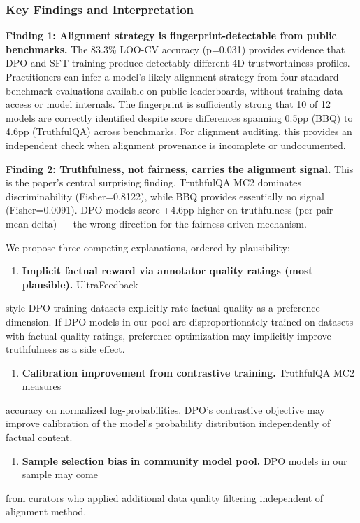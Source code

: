 
\subsubsection{Key Findings and Interpretation}

\textbf{Finding 1: Alignment strategy is fingerprint-detectable from public benchmarks.}
The 83.3\% LOO-CV accuracy (p=0.031) provides evidence that DPO and SFT training produce
detectably different 4D trustworthiness profiles. Practitioners can infer a model's
likely alignment strategy from four standard benchmark evaluations available on public
leaderboards, without training-data access or model internals. The fingerprint is
sufficiently strong that 10 of 12 models are correctly identified despite score
differences spanning 0.5pp (BBQ) to 4.6pp (TruthfulQA) across benchmarks. For alignment
auditing, this provides an independent check when alignment provenance is incomplete or
undocumented.

\textbf{Finding 2: Truthfulness, not fairness, carries the alignment signal.}
This is the paper's central surprising finding. TruthfulQA MC2 dominates discriminability
(Fisher=0.8122), while BBQ provides essentially no signal (Fisher=0.0091). DPO models
score +4.6pp higher on truthfulness (per-pair mean delta) --- the wrong direction for
the fairness-driven mechanism.

We propose three competing explanations, ordered by plausibility:

\begin{enumerate}
\item \textbf{Implicit factual reward via annotator quality ratings (most plausible).} UltraFeedback-
\end{enumerate}
   style DPO training datasets explicitly rate factual quality as a preference dimension.
   If DPO models in our pool are disproportionately trained on datasets with factual quality
   ratings, preference optimization may implicitly improve truthfulness as a side effect.

\begin{enumerate}
\item \textbf{Calibration improvement from contrastive training.} TruthfulQA MC2 measures
\end{enumerate}
   accuracy on normalized log-probabilities. DPO's contrastive objective may improve
   calibration of the model's probability distribution independently of factual content.

\begin{enumerate}
\item \textbf{Sample selection bias in community model pool.} DPO models in our sample may come
\end{enumerate}
   from curators who applied additional data quality filtering independent of alignment method.

